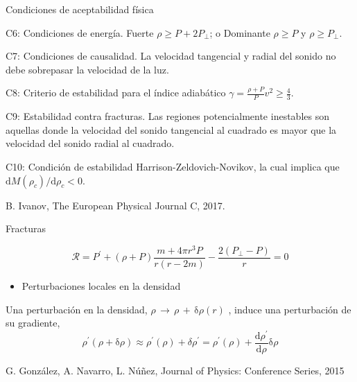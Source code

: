 \documentclass[handout,t]{beamer}
\begin{document}
\begin{frame}{Condiciones de aceptabilidad física}

\justifying

C6: Condiciones de energía. Fuerte $\rho \geq P + 2 P_{\perp}$; o Dominante $\rho \geq P$ y $\rho \geq P_{\perp}$.

\vspace{2mm}

C7: Condiciones de causalidad. La velocidad tangencial y radial del sonido no debe sobrepasar la velocidad de la luz.

\vspace{2mm}

C8: Criterio de estabilidad para el índice adiabático  $\gamma = \frac{\rho + P}{P} v^{2} \geq \frac{4}{3}$.

\vspace{2mm}

C9: Estabilidad contra fracturas. Las regiones potencialmente inestables son aquellas donde la velocidad del sonido tangencial al cuadrado es mayor que la velocidad del sonido radial al cuadrado.

\vspace{2mm}

C10: Condición de estabilidad Harrison-Zeldovich-Novikov, la cual implica que  $\mathrm{d}M(\rho_{c}) / \mathrm{d}\rho_{c} < 0 $.

\vspace{8mm}
\centering
\tiny B. Ivanov, The European Physical Journal C, 2017.

\end{frame}



\begin{frame}{Fracturas}


\begin{equation}
\label{EqHid}
 \mathcal{R} = P^{\prime}+(\rho +P)\frac{m + 4 \pi r^{3}P}{r(r-{2}m)}-\frac{2(P_\perp -P)}{r} = 0
\end{equation}

\vspace{3mm}

\begin{itemize}
\item Perturbaciones locales en la densidad
\end{itemize}

Una perturbación en la densidad, $ \rho \, \mathrm{\rightarrow} \, \rho \, {+} \,  \mathrm{\delta} \rho (r) $ , induce una perturbación de su gradiente,
\begin{equation*}
\rho^{\prime} (\rho + \mathrm{\delta} \rho) \approx \rho^{\prime} (\rho) + \delta \rho^{\prime} = \rho^{\prime} (\rho) + \frac{\mathrm{d} \rho^{\prime}}{\mathrm{d} \rho} \mathrm{\delta} \rho
\end{equation*}

\vspace{8mm}

\tiny \centering G. González, A. Navarro, L. Núñez, Journal of Physics: Conference Series, 2015

\end{frame}
\end{document}
